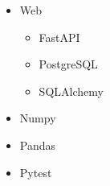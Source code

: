 \begin{itemize}
    \item Web
    \begin{itemize}
        \item FastAPI
        \item PostgreSQL
        \item SQLAlchemy
    \end{itemize}
    \item Numpy
    \item Pandas
    \item Pytest
\end{itemize}